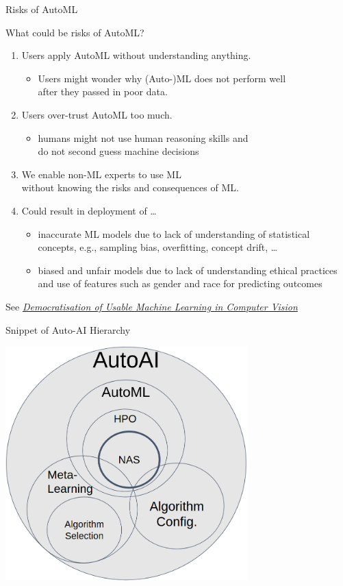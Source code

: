 \begin{frame}[c]{Risks of AutoML}

What could be risks of AutoML?
\hands
\pause

\begin{enumerate}
  \item Users apply AutoML without understanding anything.
  \begin{itemize}
    \item Users might wonder why (Auto-)ML does not perform well\\ after they passed in poor data. 
  \end{itemize}
  \pause
  \item Users over-trust AutoML too much.
  \begin{itemize}
    \item humans might not use human reasoning skills and\\ do not second guess machine decisions
  \end{itemize}
  \pause
  \item We enable non-ML experts to use ML\\ without knowing the risks and consequences of ML.
  \pause
  \item Could result in deployment of \ldots
  \begin{itemize}
    \item inaccurate ML models due to lack of understanding of statistical concepts, e.g., sampling bias, overfitting, concept drift, \ldots
    \item biased and unfair models due to lack of understanding ethical practices and use of features such as gender and race for predicting outcomes
  \end{itemize}
\end{enumerate}

See \textit{\href{https://arxiv.org/abs/1902.06804}{Democratisation of Usable Machine Learning in Computer Vision}}

\end{frame}
\begin{frame}[c]{Snippet of Auto-AI Hierarchy}

\centering
\includegraphics[width=0.7\textwidth]{images/autoai}

\end{frame}
